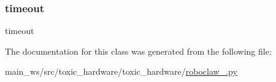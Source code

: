 \subsubsection{\texorpdfstring{timeout}{timeout}}
{\footnotesize\ttfamily timeout}



The documentation for this class was generated from the following file\+:\begin{DoxyCompactItemize}
\item 
main\+\_\+ws/src/toxic\+\_\+hardware/toxic\+\_\+hardware/\mbox{\hyperlink{roboclaw__3_8py}{roboclaw\+\_.\+py}}\end{DoxyCompactItemize}
